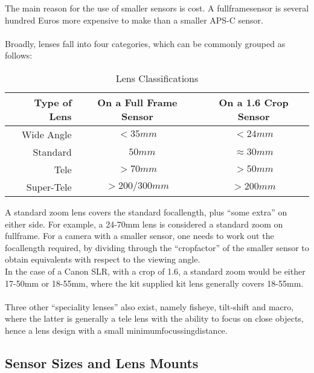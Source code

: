 The main reason for the use of smaller \glspl{sensor} is cost. A \gls{fullframesensor} is several hundred Euros more expensive to make than a smaller \gls{APS-C} \gls{sensor}.
\\
\\
Broadly, lenses fall into four categories, which can be commonly grouped as follows:

\begin{table}[htb]
	\centering
		\begin{tabular}{|rcc|}
			\hline
			Type of Lens & On a Full Frame Sensor & On a 1.6 Crop Sensor \\
			\hline
			Wide Angle   & $<35mm$ & $<24mm$ \\
			Standard     & $\quad 50mm$ & $\approx 30mm$ \\
			Tele         & $>70mm$ & $>50mm$ \\
			Super-Tele   & $>200/300mm$ & $>200mm$ \\
			\hline
		\end{tabular}
	\caption{Lens Classifications}
	\label{tab:LensClassifications}
\end{table}

A standard \gls{zoom} lens covers the standard \gls{focallength}, plus ``some extra'' on either side. For example, a 24-70mm lens is considered a standard \gls{zoom} on \gls{fullframe}. For a camera with a smaller \gls{sensor}, one needs to work out the \gls{focallength} required, by dividing through the ``\gls{cropfactor}'' of the smaller \gls{sensor} to obtain equivalents with respect to the viewing angle.
\\
In the case of a Canon \gls{SLR}, with a \gls{crop} of 1.6, a standard \gls{zoom} would be either 17-50mm or 18-55mm, where the kit supplied kit lens generally covers 18-55mm.
\\
\\
Three other ``speciality lenses'' also exist, namely fisheye, tilt-shift and macro, where the latter is generally a tele lens with the ability to focus on close objects, hence a lens design with a small \gls{minimumfocussingdistance}.


\subsection{Sensor Sizes and Lens Mounts}

